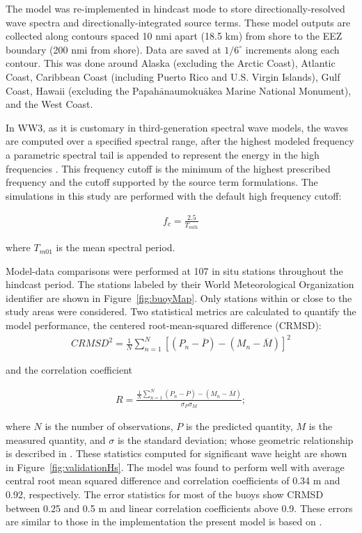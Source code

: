 The model was re-implemented in hindcast mode to store directionally-resolved wave spectra and directionally-integrated source terms. These model outputs are collected along contours spaced 10 nmi apart (18.5 km) from shore to the EEZ boundary (200 nmi from shore). Data are saved at $1/6^\circ$ increments along each contour. This was done around Alaska (excluding the Arctic Coast), Atlantic Coast, Caribbean Coast (including Puerto Rico and U.S. Virgin Islands), Gulf Coast, Hawaii (excluding the Papah$\bar{\text{a}}$naumoku$\bar{\text{a}}$kea Marine National Monument), and the West Coast. 

In WW3, as it is customary in third-generation spectral wave models, the waves are computed over a specified spectral range, after the highest modeled frequency a parametric spectral tail is appended to represent the energy in the high frequencies \citep[e.g.][]{ardhuin_semiempirical_2010}. This frequency cutoff is the minimum of the highest prescribed frequency and the cutoff supported by the source term formulations. The simulations in this study are performed with the default high frequency cutoff:

\begin{align}
    f_{c} = \frac{2.5}{T_{m01}}
    \label{eqn:freqCutoff}
\end{align}

where $T_{m01}$ is the mean spectral period.

Model-data comparisons were performed at 107 in situ stations throughout the hindcast period. The stations labeled by their World Meteorological Organization identifier are shown in Figure~\ref{fig:buoyMap}. Only stations within or close to the study areas were considered. Two statistical metrics are calculated to quantify the model performance, the centered root-mean-squared difference (CRMSD):
\begin{align}
    CRMSD^{2} = \frac{1}{N} \sum_{n=1}^{N} \left[ \left(P_{n} - \overline{P} \right) - \left(M_{n} - \overline{M} \right) \right]^{2}
\end{align}

\noindent and the correlation coefficient

\begin{align}
    R = \frac{\frac{1}{N}\sum_{n=1}^{N}\left(P_{n} - \overline{P} \right) - \left(M_{n} - \overline{M} \right)}{\sigma_{P} \sigma_{M}};
\end{align}

\noindent where $N$ is the number of observations, $P$ is the predicted quantity, $M$ is the measured quantity, and $\sigma$ is the standard deviation; whose geometric relationship is described in \citet[][]{taylor_summarizing_2001}. These statistics computed for significant wave height are shown in Figure~\ref{fig:validationHs}. The model was found to perform well with average central root mean squared difference and correlation coefficients of 0.34 m and 0.92, respectively. The error statistics for most of the buoys show CRMSD between 0.25 and 0.5 m and linear correlation coefficients above 0.9. These errors are similar to those in the implementation the present model is based on \citep[][]{chawla_validation_2013}. 

